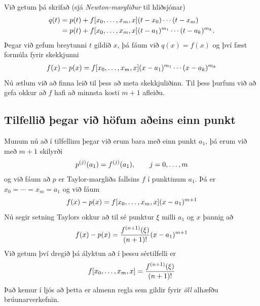 \documentclass[A4paper,10pt,icelandic]{sphinxmanual}
\begin{document}
Við getum þá skrifað (sjá \emph{Newton-margliður} til hliðsjónar)
\begin{gather}
\begin{split}\begin{aligned}
  q(t) &= p(t) + f[x_0,\ldots,x_m,x](t-x_0)\cdots(t-x_m) \\
  &= p(t) + f[x_0,\ldots,x_m,x](t-a_1)^{m_1}\cdots(t-a_k)^{m_k}.\end{aligned}\end{split}\notag
\end{gather}
Þegar við gefum breytunni \(t\) gildið \(x\), þá fáum við
\(q(x) = f(x)\) og því fæst formúla fyrir skekkjunni
\begin{gather}
\begin{split}f(x) - p(x)
  = f[x_0,\ldots,x_m,x](x-a_1)^{m_1}\cdots(x-a_k)^{m_k}\end{split}\notag
\end{gather}
Nú ætlum við að finna leið til þess að meta skekkjuliðinn. Til þess
þurfum við að gefa okkur að \(f\) hafi að minnsta kosti \(m+1\)
afleiðu.


\subsection{Tilfellið þegar við höfum aðeins einn punkt}
\label{kafli03:tilfelli-egar-vi-hofum-aeins-einn-punkt}
Munum nú að í tilfellinu þegar við erum bara með einn punkt \(a_1\),
þá erum við með \(m+1\) skilyrði
\begin{gather}
\begin{split}p^{(j)}(a_1)=f^{(j)}(a_1), \qquad j=0,\dots,m\end{split}\notag
\end{gather}
og við fáum að \(p\) er Taylor-margliða fallsins \(f\) í
punktinum \(a_1\). Þá er \(x_0=\cdots=x_m=a_1\) og við fáum
\begin{gather}
\begin{split}f(x) - p(x)
  = f[x_0,\ldots,x_m,x](x-a_1)^{m+1}\end{split}\notag
\end{gather}
Nú segir setning Taylors okkur að til sé punktur \(\xi\) milli
\(a_1\) og \(x\) þannig að
\begin{gather}
\begin{split}f(x) - p(x)
  = \dfrac{f^{(n+1)}(\xi)}{(n+1)!}(x-a_1)^{m+1}\end{split}\notag
\end{gather}
Við getum því dregið þá ályktun að í þessu sértilfelli er
\begin{gather}
\begin{split}f[x_0,\ldots,x_m,x]=\dfrac{f^{(n+1)}(\xi)}{(n+1)!}\end{split}\notag
\end{gather}
Það kemur í ljós að þetta er almenn regla sem gildir fyrir \emph{öll}
alhæfðu brúunarverkefnin.
\end{document}
